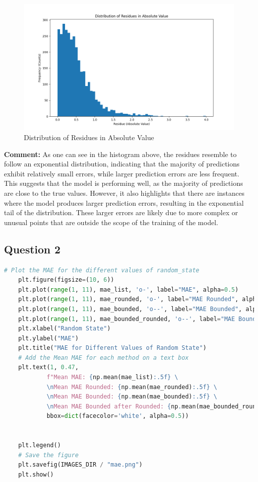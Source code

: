 \documentclass{article}
\begin{document}
\begin{figure}[H]
    \includegraphics*[width=\linewidth]{images/residues.png}
    \caption{Distribution of Residues in Absolute Value}
\end{figure}

\textbf{Comment:}
As one can see in the histogram above, the residues resemble to follow an exponential distribution, indicating that the majority of predictions exhibit relatively small errors, while larger prediction errors are less frequent.
This suggests that the model is performing well, as the majority of predictions are close to the true values. However, it also highlights that there are instances where the model produces larger prediction errors, resulting in the exponential tail of the distribution. These larger errors are likely due to more complex or unusual points that are outside the scope of the training of the model.

\subsection*{Question 2}

\begin{lstlisting}[language=Python]
    # Plot the MAE for the different values of random_state
    plt.figure(figsize=(10, 6))
    plt.plot(range(1, 11), mae_list, 'o-', label="MAE", alpha=0.5)
    plt.plot(range(1, 11), mae_rounded, 'o-', label="MAE Rounded", alpha=0.5)
    plt.plot(range(1, 11), mae_bounded, 'o--', label="MAE Bounded", alpha=0.5)
    plt.plot(range(1, 11), mae_bounded_rounded, 'o--', label="MAE Bounded Rounded", alpha=0.5)
    plt.xlabel("Random State")
    plt.ylabel("MAE")
    plt.title("MAE for Different Values of Random State")
    # Add the Mean MAE for each method on a text box
    plt.text(1, 0.47,
            f"Mean MAE: {np.mean(mae_list):.5f} \
            \nMean MAE Rounded: {np.mean(mae_rounded):.5f} \
            \nMean MAE Bounded: {np.mean(mae_bounded):.5f} \
            \nMean MAE Bounded after Rounded: {np.mean(mae_bounded_rounded):.5f}",
            bbox=dict(facecolor='white', alpha=0.5))


    plt.legend()
    # Save the figure
    plt.savefig(IMAGES_DIR / "mae.png")
    plt.show()
\end{lstlisting}
\end{document}

